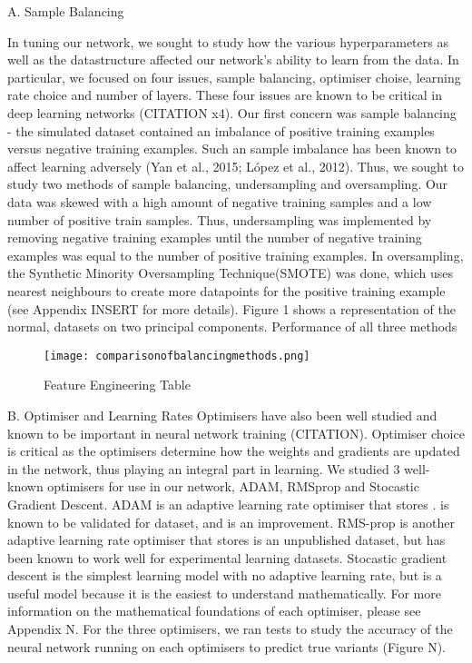 \documentclass{article}
\begin{document}
A. Sample Balancing

In tuning our network, we sought to study how the various hyperparameters as well as the datastructure affected our network's ability to learn from the data. In particular, we focused on four issues, sample balancing, optimiser choise, learning rate choice and number of layers. These four issues are known to be critical in deep learning networks (CITATION x4). Our first concern was sample balancing - the simulated dataset contained an imbalance of positive training examples versus negative training examples. Such an sample imbalance has been known to affect learning adversely (Yan et al., 2015; López et al., 2012). Thus, we sought to study two methods of sample balancing, undersampling and oversampling. Our data was skewed with a high amount of negative training samples and  a low number of positive train samples. Thus, undersampling was implemented by removing negative training examples until the number of negative training examples was equal to the number of positive training examples. In oversampling, the Synthetic Minority Oversampling Technique(SMOTE) was done, which uses nearest neighbours to create more datapoints for the positive training example (see Appendix INSERT for more details). Figure 1 shows a representation of the normal, datasets on two principal components. Performance of all three methods 	


\begin{figure}[H]
\caption{Feature Engineering Table}
\texttt{[image: comparisonofbalancingmethods.png]}
\centering
\end{figure}

B. Optimiser and Learning Rates
Optimisers have also been well studied and known to be important in neural network training (CITATION). Optimiser choice is critical as the optimisers determine how the weights and gradients are updated in the network, thus playing an integral part in learning. We studied 3 well-known optimisers for use in our network, ADAM, RMSprop and Stocastic Gradient Descent. ADAM is an adaptive learning rate optimiser that stores . is known to be validated for dataset, and is an improvement. RMS-prop is another adaptive learning rate optimiser that stores is an unpublished dataset, but has been known to work well for experimental learning datasets. Stocastic gradient descent is the simplest learning model with no adaptive learning rate, but is a useful model because it is the easiest to understand mathematically. For more information on the mathematical foundations of each optimiser, please see Appendix N. For the three optimisers, we ran tests to study the accuracy of the neural network running on each optimisers to predict true variants (Figure N).
\end{document}
